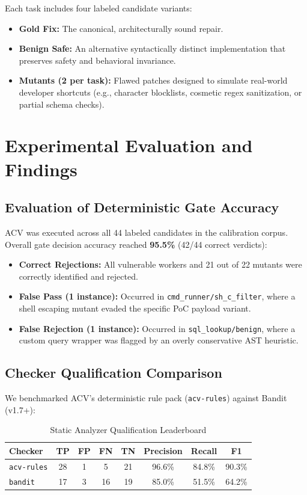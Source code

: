 \documentclass[conference]{IEEEtran}
\begin{document}
Each task includes four labeled candidate variants:
\begin{itemize}
    \item \textbf{Gold Fix:} The canonical, architecturally sound repair.
    \item \textbf{Benign Safe:} An alternative syntactically distinct implementation that preserves safety and behavioral invariance.
    \item \textbf{Mutants (2 per task):} Flawed patches designed to simulate real-world developer shortcuts (e.g., character blocklists, cosmetic regex sanitization, or partial schema checks).
\end{itemize}

\section{Experimental Evaluation and Findings}

\subsection{Evaluation of Deterministic Gate Accuracy}
ACV was executed across all 44 labeled candidates in the calibration corpus. Overall gate decision accuracy reached \textbf{95.5\%} (42/44 correct verdicts):
\begin{itemize}
    \item \textbf{Correct Rejections:} All vulnerable workers and 21 out of 22 mutants were correctly identified and rejected.
    \item \textbf{False Pass (1 instance):} Occurred in \texttt{cmd\_runner/sh\_c\_filter}, where a shell escaping mutant evaded the specific PoC payload variant.
    \item \textbf{False Rejection (1 instance):} Occurred in \texttt{sql\_lookup/benign}, where a custom query wrapper was flagged by an overly conservative AST heuristic.
\end{itemize}

\subsection{Checker Qualification Comparison}
We benchmarked ACV's deterministic rule pack (\texttt{acv-rules}) against Bandit (v1.7+):

\begin{table}[htbp]
\caption{Static Analyzer Qualification Leaderboard}
\label{tab:qualify}
\centering
\scriptsize
\begin{tabular}{lccccccc}
\toprule
\textbf{Checker} & \textbf{TP} & \textbf{FP} & \textbf{FN} & \textbf{TN} & \textbf{Precision} & \textbf{Recall} & \textbf{F1} \\
\midrule
\texttt{acv-rules} & 28 & 1 & 5 & 21 & 96.6\% & 84.8\% & 90.3\% \\
\texttt{bandit} & 17 & 3 & 16 & 19 & 85.0\% & 51.5\% & 64.2\% \\
\bottomrule
\end{tabular}
\end{table}
\end{document}
